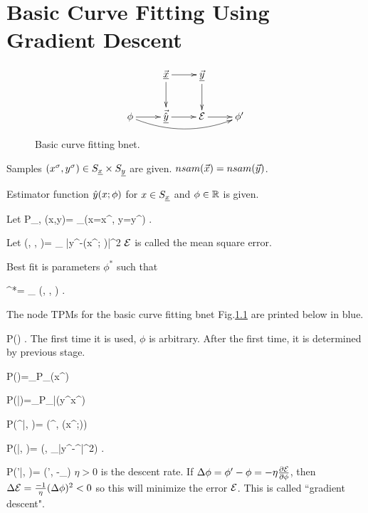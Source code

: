\chapter{Basic Curve Fitting
Using Gradient Descent}
\label{ch-basic-fit}

\begin{figure}[h!]
\centering
$$\xymatrix{
&\vec{\rvx}\ar[d]\ar[r]&\ul{\vecy}
\ar[d]&\\
\phi\ar[r]\ar@/_1pc/[rrr]&
\vec{\hat{\rvy}}\ar[r]&\cale\ar[r]&\phi'
}$$
\caption{Basic curve fitting bnet.}
\label{fig-bfit}
\end{figure}


Samples 
$(x^\sigma, y^\sigma)\in S_{\underline{x}}\times S_{\underline{y}}$
are given. $nsam({\vec{x}})=nsam({\vec{y}})$.

Estimator function 
${\hat{y}}(x; \phi)$
for $x\in S_{\underline{x}}$ and $\phi\in{ \mathbb{R}}$
is given.

Let 
\beq
P_{\rvx, \rvy}(x,y)=
\sum_\s \indi(x=x^\s, y=y^\s)
\;.
\eeq


Let 
\beq
\cale(\vecx, \vecy, \phi)=
\sum_\s
|y^\s-\haty(x^\s; \phi)|^2
\;
\eeq
${\cal E}$ is called the mean square error.

Best fit is parameters $\phi^*$
such that

\beq 
\phi^*= \argmin_\phi
\cale(\vecx, \vecy, \phi)
\;.
\eeq

The node TPMs for
the basic curve fitting bnet
 Fig.\ref{fig-bfit} are
printed below in blue.

\beq\color{blue}
P(\phi) 
\;.
\eeq
The first time
it is used, $\phi$ is arbitrary.
After the first time, it is determined 
by previous stage.

\beq\color{blue}
P(\vecx)=\prod_\s P_\rvx(x^\s)
\eeq

\beq\color{blue}
P(\vecy|\vecx)=\prod_\s P_{\rvy|\rvx}(y^\s\cond x^\s)
\eeq

\beq\color{blue}
P(\haty^\s|\phi, \vecx)=
\delta(\haty^\s, \haty(x^\s;\phi))
\eeq


\beq\color{blue}
P(\cale|\vec{\haty}, \vecy)=
\delta(\cale,
\sum_\s |y^\s-\haty^\s|^2)
\;.
\eeq


\beq\color{blue}
P(\phi'|\phi, \cale)=
\delta(\phi',
\phi-\eta\partial_\phi\cale)
\eeq
$\eta>0$ is the descent rate.
If $\Delta \phi=\phi'-\phi=-\eta 
\frac{\partial{\cal E}}
{\partial \phi}$, then
 $\Delta {\cal E}=\frac{-1}{\eta}
(\Delta\phi)^2<0$  so this will
minimize the error
${\cal E}$.
This is called ``gradient descent".